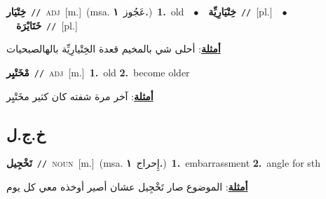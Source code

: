 \documentclass[10pt,a4paper,twoside]{article} %
\begin{document}
\begin{multicols}{2}
{\setlength\topsep{0pt}\textbf{\foreignlanguage{arabic}{خِتْيَار}}\ {\color{gray}\texttt{//}\color{black}}\ \textsc{adj}\ [m.]\ \color{gray}(msa. \foreignlanguage{arabic}{عَجُوز}~\foreignlanguage{arabic}{\textbf{١.}})\color{black}\ \textbf{1.}~old\ \ $\bullet$\ \ \setlength\topsep{0pt}\textbf{\foreignlanguage{arabic}{خِتْيَارِيِّة}}\ {\color{gray}\texttt{//}\color{black}}\ [pl.]\ \ $\bullet$\ \ \setlength\topsep{0pt}\textbf{\foreignlanguage{arabic}{خَتَايْرَة}}\ {\color{gray}\texttt{//}\color{black}}\ [pl.]\  \begin{flushright}\color{gray}\foreignlanguage{arabic}{\textbf{\underline{\foreignlanguage{arabic}{أمثلة}}}: أحلى شي بالمخيم قعدة الخِتْيارِيِّة  بالهالصبحيات}\end{flushright}\color{black}} \vspace{2mm}

{\setlength\topsep{0pt}\textbf{\foreignlanguage{arabic}{مْخَتْيِر}}\ {\color{gray}\texttt{//}\color{black}}\ \textsc{adj}\ [m.]\ \textbf{1.}~old  \textbf{2.}~become older\  \begin{flushright}\color{gray}\foreignlanguage{arabic}{\textbf{\underline{\foreignlanguage{arabic}{أمثلة}}}: آخر مرة شفته كان كثير مخَتْيِر}\end{flushright}\color{black}} \vspace{2mm}

\vspace{-3mm}
\subsection*{\color{blue}\foreignlanguage{arabic}{خ.ج.ل}\color{blue}{}} 

{\setlength\topsep{0pt}\textbf{\foreignlanguage{arabic}{تَخْجِيل}}\ {\color{gray}\texttt{//}\color{black}}\ \textsc{noun}\ [m.]\ \color{gray}(msa. \foreignlanguage{arabic}{إِحراج}~\foreignlanguage{arabic}{\textbf{١.}})\color{black}\ \textbf{1.}~embarrassment  \textbf{2.}~angle for sth\  \begin{flushright}\color{gray}\foreignlanguage{arabic}{\textbf{\underline{\foreignlanguage{arabic}{أمثلة}}}: الموضوع صار تَخْجِيل عشان أصير أوخذه معي كل يوم}\end{flushright}\color{black}} \vspace{2mm}


\end{multicols}
\end{document}

